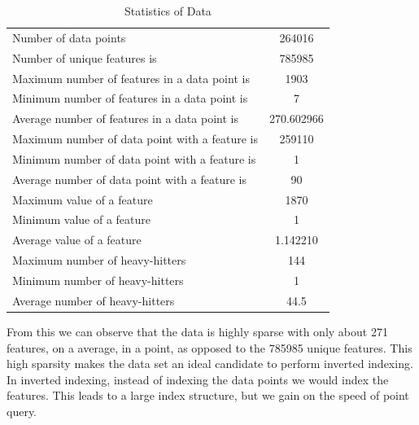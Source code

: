 \begin{table}[ht!]
\centering
\caption{Statistics of Data}
\begin{tabular}{|l|c|}
\hline 
Number of data points & 264016 \\ 
Number of unique features is & 785985 \\ 
Maximum number of features in a data point is & 1903 \\ 
Minimum number of features in a data point is  & 7 \\ 
Average number of features in a data point is & 270.602966 \\ 
Maximum number of data point with a feature is & 259110 \\ 
Minimum number of data point with a feature is & 1 \\ 
Average number of data point with a feature is & 90
 \\ 
Maximum value of a feature  & 1870 \\ 
Minimum value of a feature
 & 1 \\ 
Average value of a feature & 1.142210 \\ 
Maximum number of heavy-hitters  & 144 \\ 
Minimum number of heavy-hitters  & 1 \\ 
 Average number of heavy-hitters  & 44.5 \\ 
\hline 
\end{tabular} 
\end{table}

From this we can observe that the data is highly sparse with only about 271 features, on a average, in a point, as opposed to the 785985 unique features. This high sparsity makes the data set an ideal candidate to perform inverted indexing. In inverted indexing, instead of indexing the data points we would index the features. This leads to a large index structure, but we gain on the speed of point query. \\

